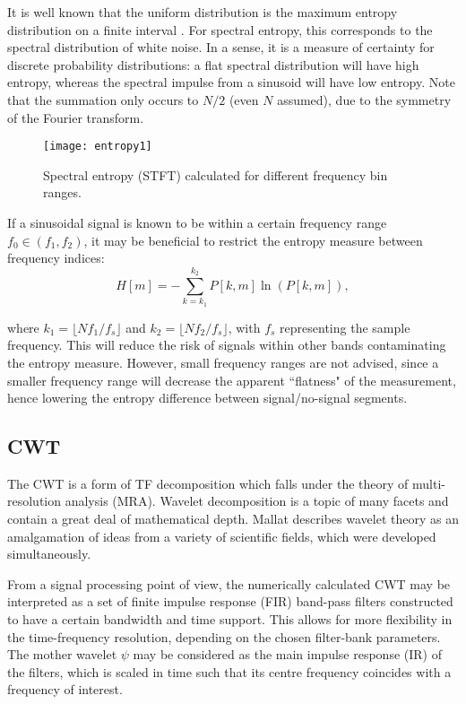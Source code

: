 It is well known that the uniform distribution is the maximum entropy distribution on a finite interval \citep{maxentropy}.  For spectral entropy, this corresponds to the spectral distribution of white noise. In a sense, it is a measure of certainty for discrete probability distributions: a flat spectral distribution will have high entropy, whereas the spectral impulse from a sinusoid will have low entropy. Note that the summation only occurs to $N/2$ (even $N$ assumed), due to the symmetry of the Fourier transform.

\begin{figure}[!t]
	\centering
	\texttt{[image: entropy1]}
	\caption{Spectral entropy (STFT) calculated for different frequency bin ranges.}
	\label{fig:entropy1}
\end{figure}

If a sinusoidal signal is known to be within a certain frequency range $f_0 \in (f_1, f_2)$, it may be beneficial to restrict the entropy measure between frequency indices:
\begin{equation*}
	H[m] = - \sum_{k=k_1}^{k_2} P[k,m] \ln (P[k,m]),
\end{equation*}

\noindent where $k_1 = \lfloor N f_1/f_s\rfloor$ and $k_2 = \lfloor N f_2/f_s\rfloor$, with $f_s$ representing the sample frequency. This will reduce the risk of signals within other bands contaminating the entropy measure. However, small frequency ranges are not advised, since a smaller frequency range will decrease the apparent ``flatness" of the measurement, hence lowering the entropy difference between signal/no-signal segments.



\subsection{CWT}
The CWT is a form of TF decomposition which falls under the theory of multi-resolution analysis (MRA). Wavelet decomposition is a topic of many facets and contain a great deal of mathematical depth. Mallat \citep{waveletbook} describes wavelet theory as an amalgamation of ideas from a variety of scientific fields, which were developed simultaneously.
 
From a signal processing point of view, the numerically calculated CWT may be interpreted as a set of finite impulse response (FIR) band-pass filters constructed to have a certain bandwidth and time support. This allows for more flexibility in the time-frequency resolution, depending on the chosen filter-bank parameters. The mother wavelet $\psi$ may be considered as the main impulse response (IR) of the filters, which is scaled in time such that its centre frequency coincides with a frequency of interest.

